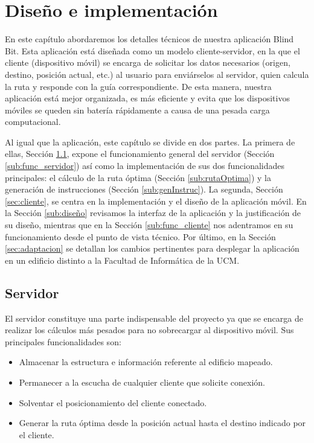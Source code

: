 ﻿\chapter{Diseño e implementación}
\label{cap:diseñoeimplementación}


En este capítulo abordaremos los detalles técnicos de nuestra aplicación Blind Bit. Esta aplicación está diseñada como un modelo cliente-servidor, en la que el cliente (dispositivo móvil) se encarga de solicitar los datos necesarios (origen, destino, posición actual, etc.) al usuario para enviárselos al servidor, quien calcula la ruta y responde con la guía correspondiente. De esta manera, nuestra aplicación está mejor organizada, es más eficiente y evita que los dispositivos móviles se queden sin batería rápidamente a causa de una pesada carga computacional.

Al igual que la aplicación, este capítulo se divide en dos partes. La primera de ellas, Sección \ref{sec:servidor}, expone el funcionamiento general del servidor (Sección \ref{sub:func_servidor}) así como la implementación de sus dos funcionalidades principales: el cálculo de la ruta óptima (Sección \ref{sub:rutaOptima}) y la generación de instrucciones (Sección \ref{sub:genInstruc}). La segunda, Sección \ref{sec:cliente}, se centra en la implementación y el diseño de la aplicación móvil. En la Sección \ref{sub:diseño} revisamos la interfaz de la aplicación y la justificación de su diseño, mientras que en la Sección \ref{sub:func_cliente} nos adentramos en su funcionamiento desde el punto de vista técnico. Por último, en la Sección \ref{sec:adaptacion} se detallan los cambios pertinentes para desplegar la aplicación en un edificio distinto a la Facultad de Informática de la UCM.



\section{Servidor}
\label{sec:servidor}
El servidor constituye una parte indispensable del proyecto ya que se encarga de realizar los cálculos más pesados para no sobrecargar al dispositivo móvil. Sus principales funcionalidades son:
\begin{itemize}
	\item Almacenar la estructura e información referente al edificio mapeado.
	\item Permanecer a la escucha de cualquier cliente que solicite conexión.
	\item Solventar el posicionamiento del cliente conectado.
	\item Generar la ruta óptima desde la posición actual hasta el destino indicado por el cliente.
\end{itemize} 

